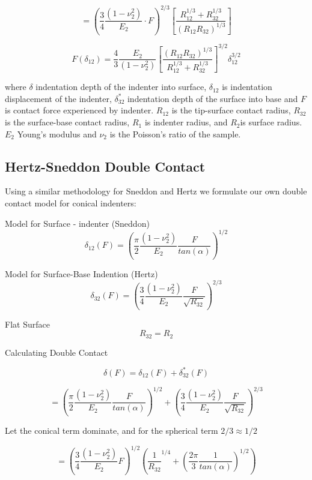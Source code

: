 $$ =    \left( \frac{3}{4} \frac{(1-\nu_2^2)}{E_2} \cdot F \right)^{2/3} \left[ \frac{R_{12}^{1/3}+R_{32}^{1/3}}{(R_{12}R_{32})^{1/3}} \right] 
$$

\begin{equation}  F(\delta_{12}) =  \frac{4}{3} \frac{E_2}{(1-\nu_2^2)} \left[ \frac{(R_{12}R_{32})^{1/3}}{R_{12}^{1/3}+R_{32}^{1/3}} \right]^{3/2}\delta_{12}^{3/2} \label{eq: Hertz Double Contact}\end{equation}

where $\delta$ indentation depth of the indenter into surface, $\delta_{12}$ is indentation displacement of the indenter, $\delta^*_{32}$ indentation depth of the surface into base and $F$ is contact force experienced by indenter. $R_{12}$ is the tip-surface contact radius, $R_{32}$ is the surface-base contact radius, $R_1$ is indenter radius, and $R_2$is surface radius. $E_2$ Young’s modulus and $\nu_2$ is the Poisson’s ratio of the sample.

\subsection{Hertz-Sneddon Double Contact \label{Appendix: Sneddon Double}}
Using a similar methodology for Sneddon and Hertz we formulate our own double contact model for conical indenters: 

Model for Surface - indenter (Sneddon)
$$ \delta_{12}(F) = \left(\frac{\pi}{2}\frac{(1-\nu_2^2)}{E_2} \frac{F}{tan(\alpha)}\right)^{1/2}$$

 Model for Surface-Base Indention (Hertz)
$$ \delta_{32}(F) = \left( \frac{3}{4} \frac{(1-\nu_2^2)}{E_2} \frac{F}{\sqrt{R_{32}}} \right)^{2/3}$$

 Flat Surface 
$$R_{32} = R_{2}$$

 Calculating Double Contact

$$ \delta(F) = \delta_{12}(F) + \delta_{32}^*(F)  $$

$$ = \left(\frac{\pi}{2}\frac{(1-\nu_2^2)}{E_2} \frac{F}{tan(\alpha)}\right)^{1/2}  +  \left( \frac{3}{4} \frac{(1-\nu_2^2)}{E_2} \frac{F}{\sqrt{R_{32}}} \right)^{2/3}
$$

Let the conical term dominate, and for the spherical term  $2/3 \approx 1/2$

\begin{equation} =  \left( \frac{3}{4} \frac{(1-\nu_2^2)}{E_2} F \right)^{1/2} \left(\frac{1}{R_{32}}^{1/4} + (\frac{2\pi}{3}\frac{1}{tan(\alpha)})^{1/2} \right)   \end{equation}

